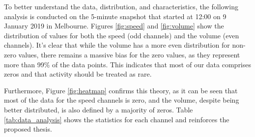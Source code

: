 To better understand the data, distribution, and characteristics, the following analysis is conducted on the 5-minute snapshot that started at 12:00 on 9 January 2019 in Melbourne. Figures \ref{fig:speed} and \ref{fig:volume} show the distribution of values for both the speed (odd channels) and the volume (even channels). It's clear that while the volume has a more even distribution for non-zero values, there remains a massive bias for the zero values, as they represent more than 99\% of the data points. This indicates that most of our data comprises zeros and that activity should be treated as rare.

Furthermore, Figure \ref{fig:heatmap} confirms this theory, as it can be seen that most of the data for the speed channels is zero, and the volume, despite being better distributed, is also defined by a majority of zeros. Table \ref{tab:data_analysis} shows the statistics for each channel and reinforces the proposed thesis.



